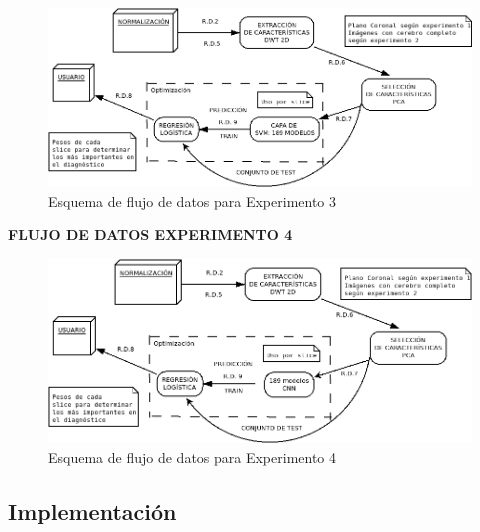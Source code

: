 \begin{figure}[H] %
	\centering
	\includegraphics[scale=0.45]{fdexp3.png}  %
	\caption{Esquema de flujo de datos para Experimento 3} 
	\label{fig:fdexp3}
\end{figure}
\newpage
\textbf{FLUJO DE DATOS EXPERIMENTO 4}
\vspace{0.5cm}

\begin{figure}[H] %
	\centering
	\includegraphics[scale=0.45]{fdexp4.png}  %
	\caption{Esquema de flujo de datos para Experimento 4} 
	\label{fig:fdexp4}
\end{figure}

\subsection{Implementación}

